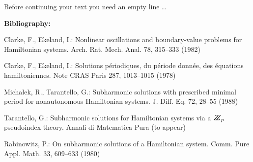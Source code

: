 \documentclass{llncs}
\begin{document}
Before continuing your text you need an empty line \dots

{\bfseries Bibliography:} \cite{clarke1982nonlinear}
%


%
%
\begin{thebibliography}{}
%
Clarke, F., Ekeland, I.:
Nonlinear oscillations and
boundary-value problems for Hamiltonian systems.
Arch. Rat. Mech. Anal. 78, 315--333 (1982)

Clarke, F., Ekeland, I.:
Solutions p\'{e}riodiques, du
p\'{e}riode donn\'{e}e, des \'{e}quations hamiltoniennes.
Note CRAS Paris 287, 1013--1015 (1978)

Michalek, R., Tarantello, G.:
Subharmonic solutions with prescribed minimal
period for nonautonomous Hamiltonian systems.
J. Diff. Eq. 72, 28--55 (1988)

Tarantello, G.:
Subharmonic solutions for Hamiltonian
systems via a $\bbbz_{p}$ pseudoindex theory.
Annali di Matematica Pura (to appear)

Rabinowitz, P.:
On subharmonic solutions of a Hamiltonian system.
Comm. Pure Appl. Math. 33, 609--633 (1980)

\end{thebibliography}

%
\end{document}
